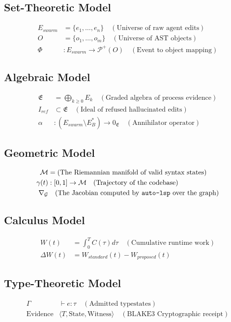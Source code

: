 \subsection{Set-Theoretic Model}
\begin{align*}
E_{swarm} &= \{e_1, \dots, e_n\} \quad (\text{Universe of raw agent edits}) \\
O &= \{o_1, \dots, o_m\} \quad (\text{Universe of AST objects}) \\
\Phi &: E_{swarm} \to \mathcal{P}^+(O) \quad (\text{Event to object mapping})
\end{align*}

\subsection{Algebraic Model}
\begin{align*}
\mathfrak{E} &= \bigoplus_{k \geq 0} E_k \quad (\text{Graded algebra of process evidence}) \\
I_{ref} &\subset \mathfrak{E} \quad (\text{Ideal of refused hallucinated edits}) \\
\alpha &: (E_{swarm} \setminus E_B^*) \to 0_{\mathfrak{E}} \quad (\text{Annihilator operator})
\end{align*}

\subsection{Geometric Model}
\begin{align*}
\mathcal{M} &= (\text{The Riemannian manifold of valid syntax states}) \\
\gamma(t) &: [0, 1] \to \mathcal{M} \quad (\text{Trajectory of the codebase}) \\
\nabla_{\mathcal{G}} &\quad (\text{The Jacobian computed by \texttt{auto-lsp} over the graph})
\end{align*}

\subsection{Calculus Model}
\begin{align*}
W(t) &= \int_0^T C(\tau) d\tau \quad (\text{Cumulative runtime work}) \\
\Delta W(t) &= W_{standard}(t) - W_{proposed}(t)
\end{align*}

\subsection{Type-Theoretic Model}
\begin{align*}
\Gamma &\vdash e : \tau \quad (\text{Admitted typestates}) \\
\text{Evidence}&\langle T, \text{State}, \text{Witness}\rangle \quad (\text{BLAKE3 Cryptographic receipt})
\end{align*}

